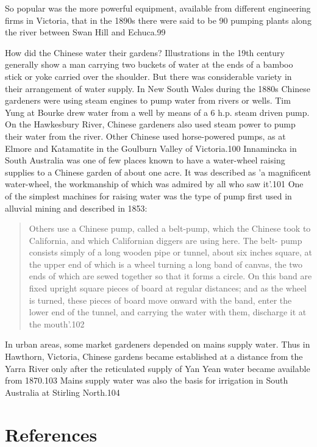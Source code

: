 So popular was the more powerful equipment, available from different
engineering firms in Victoria, that in the 1890s there were said to be
90 pumping plants along the river between Swan Hill and Echuca.99

How did the Chinese water their gardens? Illustrations in the 19th
century generally show a man carrying two buckets of water at the ends
of a bamboo stick or yoke carried over the shoulder. But there was
considerable variety in their arrangement of water supply. In New
South Wales during the 1880s Chinese gardeners were using steam
engines to pump water from rivers or wells. Tim Yung at Bourke drew
water from a well by means of a 6 h.p. steam driven pump. On the
Hawkesbury River, Chinese gardeners also used steam power to pump
their water from the river. Other Chinese used horse-powered pumps, as
at Elmore and Katamatite in the Goulburn Valley of Victoria.100
Innamincka in South Australia was one of few places known to have a
water-wheel raising supplies to a Chinese garden of about one acre. It
was described as 'a magnificent water-wheel, the workmanship of which
was admired by all who saw it'.101 One of the simplest machines for
raising water was the type of pump first used in alluvial mining and
described in 1853:
\begin{quote}	
	Others use a Chinese pump, called a belt-pump, which the
	Chinese took to California, and which Californian diggers are
	using here. The belt- pump consists simply of a long wooden
	pipe or tunnel, about six inches square, at the upper end of
	which is a wheel turning a long band of canvas, the two ends
	of which are sewed together so that it forms a circle. On this
	band are fixed upright square pieces of board at regular
	distances; and as the wheel is turned, these pieces of board
	move onward with the band, enter the lower end of the tunnel,
	and carrying the water with them, discharge it at the
	mouth'.102
\end{quote}

In urban areas, some market gardeners depended on mains supply
water. Thus in Hawthorn, Victoria, Chinese gardens became established
at a distance from the Yarra River only after the reticulated supply
of Yan Yean water became available from 1870.103 Mains supply water
was also the basis for irrigation in South Australia at Stirling
North.104

\section{References}

